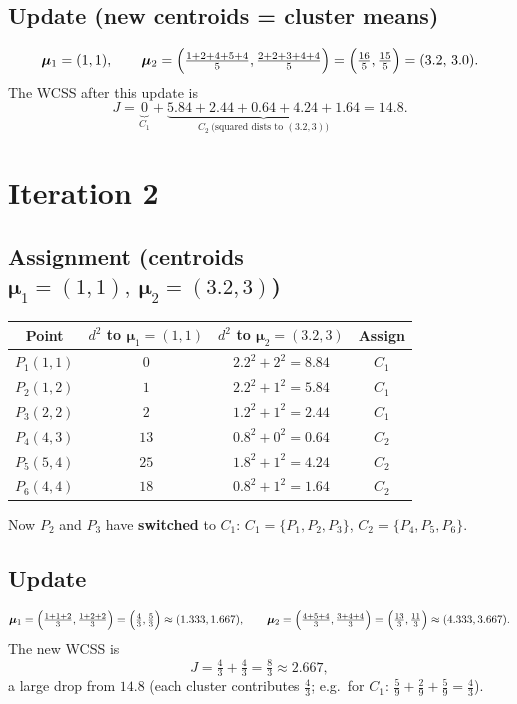 \documentclass[11pt,a4paper]{report}
\theoremstyle{definition}
\theoremstyle{plain}
\theoremstyle{remark}
\newcommand{\vmu}{\bm{\mu}}
\begin{document}
	\subsection*{Update (new centroids = cluster means)}
	\[
	\vmu_1=(1,1),\qquad
	\vmu_2=\Bigl(\tfrac{1+2+4+5+4}{5},\tfrac{2+2+3+4+4}{5}\Bigr)
	=\Bigl(\tfrac{16}{5},\tfrac{15}{5}\Bigr)=(3.2,\,3.0).
	\]
	The WCSS after this update is
	\[
	J=\underbrace{0}_{C_1}
	+\underbrace{5.84+2.44+0.64+4.24+1.64}_{C_2\ \text{(squared dists to }(3.2,3))}
	=14.8 .
	\]
	
	\section{Iteration 2}
	\subsection*{Assignment (centroids $\vmu_1=(1,1),\ \vmu_2=(3.2,3)$)}
	\begin{center}
		\begin{tabular}{@{}cccc@{}}
			\toprule
			Point & $d^2$ to $\vmu_1=(1,1)$ & $d^2$ to $\vmu_2=(3.2,3)$ & Assign\\
			\midrule
			$P_1(1,1)$ & $0$  & $2.2^2+2^2=8.84$   & $C_1$\\
			$P_2(1,2)$ & $1$  & $2.2^2+1^2=5.84$   & $C_1$\\
			$P_3(2,2)$ & $2$  & $1.2^2+1^2=2.44$   & $C_1$\\
			$P_4(4,3)$ & $13$ & $0.8^2+0^2=0.64$   & $C_2$\\
			$P_5(5,4)$ & $25$ & $1.8^2+1^2=4.24$   & $C_2$\\
			$P_6(4,4)$ & $18$ & $0.8^2+1^2=1.64$   & $C_2$\\
			\bottomrule
		\end{tabular}
	\end{center}
	Now $P_2$ and $P_3$ have \textbf{switched} to $C_1$:
	$C_1=\{P_1,P_2,P_3\}$, $C_2=\{P_4,P_5,P_6\}$.
	
	\subsection*{Update}
	\[
	\vmu_1=\Bigl(\tfrac{1+1+2}{3},\tfrac{1+2+2}{3}\Bigr)=\Bigl(\tfrac43,\tfrac53\Bigr)
	\approx(1.333,1.667),\qquad
	\vmu_2=\Bigl(\tfrac{4+5+4}{3},\tfrac{3+4+4}{3}\Bigr)=\Bigl(\tfrac{13}{3},\tfrac{11}{3}\Bigr)
	\approx(4.333,3.667).
	\]
	The new WCSS is
	\[
	J=\tfrac43+\tfrac43=\tfrac83\approx 2.667,
	\]
	a large drop from $14.8$ (each cluster contributes $\tfrac43$; e.g.\ for $C_1$:
	$\tfrac59+\tfrac29+\tfrac59=\tfrac43$).
	
\end{document}
